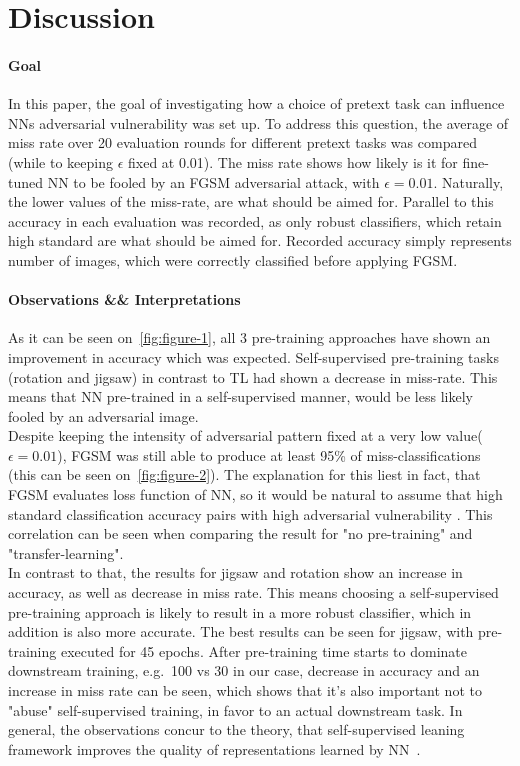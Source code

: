 \section{Discussion}

\paragraph{Goal}In this paper,
the goal of investigating how a choice of pretext task can influence NNs adversarial vulnerability was set up.
To address this question, the average of miss rate over 20 evaluation rounds for different pretext tasks was compared
(while to keeping $\epsilon$ fixed at 0.01).
The miss rate shows how likely is it for fine-tuned NN to be fooled by an FGSM adversarial attack,
with $\epsilon = 0.01$.
Naturally, the lower values of the miss-rate, are what should be aimed for.
Parallel to this accuracy in each evaluation was recorded, as only robust classifiers, which retain high standard
are what should be aimed for.
Recorded accuracy simply represents number of images, which were correctly classified before applying FGSM.

\paragraph{Observations \&\& Interpretations} As it can be seen on~\ref{fig:figure-1},
all 3 pre-training approaches have shown an improvement in accuracy which was expected.
Self-supervised pre-training tasks (rotation and jigsaw) in contrast to TL had shown a decrease
in miss-rate.
This means that NN pre-trained in a self-supervised manner, would be less likely fooled by an adversarial image.
\\
Despite keeping the intensity of adversarial pattern fixed at a very low value($\epsilon = 0.01$),
FGSM was still able to produce at least 95\% of miss-classifications (this can be seen on~\ref{fig:figure-2}).
The explanation for this liest in fact, that FGSM evaluates loss function of NN,
so it would be natural to assume that high standard classification accuracy pairs with high adversarial vulnerability
\cite{https://doi.org/10.48550/arxiv.1805.12152}.
This correlation can be seen when comparing the result for "no pre-training" and "transfer-learning".
\\
In contrast to that, the results for jigsaw and rotation show an increase in accuracy, as well
as decrease in miss rate.
This means choosing a self-supervised pre-training approach is likely to result in a more robust classifier,
which in addition is also more accurate.
The best results can be seen for jigsaw, with pre-training executed for 45 epochs.
After pre-training time starts to dominate downstream training, e.g.\ 100 vs 30 in our case,
decrease in accuracy and an increase in miss rate can be seen, which shows that it's also important
not to "abuse" self-supervised training, in favor to an actual downstream task.
In general, the observations concur to the theory,
that self-supervised leaning framework improves the quality of representations
learned by NN~\cite{kolesnikov2019revisiting}.


